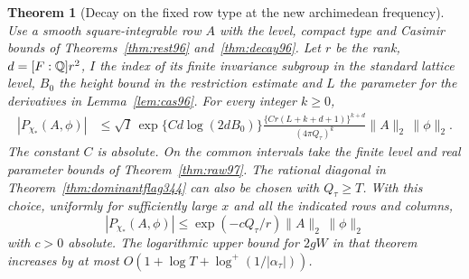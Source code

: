 \documentclass[a4paper,11pt]{article}
\newtheorem{theorem}[proposition]{Theorem}
\theoremstyle{definition}
\theoremstyle{remark}
\numberwithin{equation}{section}
\begin{document}
\begin{theorem}[Decay on the fixed row type at the new archimedean frequency]\leavevmode\label{thm:displacedreal344}
Use a smooth square-integrable row $A$ with the level, compact type
and Casimir bounds of Theorems~\ref{thm:rest96} and~\ref{thm:decay96}.
Let $r$ be the rank, $d=[F:\mathbb Q]r^2$, $I$ the index of its finite
invariance subgroup in the standard lattice level, $B_0$ the height
bound in the restriction estimate and $L$ the parameter for
the derivatives in Lemma~\ref{lem:cas96}. For every integer $k\ge0$,
\[
 \begin{split}
 |P_{\chi_*}(A,\phi)|
 &\le \sqrt I\,\exp\{C d\log(2d B_0)\}
       \frac{\{Cr(L+k+d+1)\}^{k+d}}{(4\pi Q_\tau)^k}
                                  \|A\|_2\,\|\phi\|_2 .
 \end{split}
\]
The constant $C$ is absolute. On the common intervals take the
finite level and real parameter bounds of Theorem~\ref{thm:raw97}.
The rational diagonal in Theorem~\ref{thm:dominantflag344} can
also be chosen with $Q_\tau\ge T$. With this choice, uniformly
for sufficiently large $x$ and all the indicated rows and columns,
\[
               |P_{\chi_*}(A,\phi)|
                    \le \exp(-cQ_\tau/r)\|A\|_2\,\|\phi\|_2
\]
with $c>0$ absolute. The logarithmic upper bound for $2gW$ in
that theorem increases by at most
$O(1+\log T+\log^+(1/|\alpha_\tau|))$.
\end{theorem}
\end{document}
